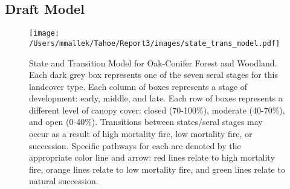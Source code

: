 \subsection*{Draft Model}
\begin{figure}[htbp]
\centering
\texttt{[image: /Users/mmallek/Tahoe/Report3/images/state\_trans\_model.pdf]}
\caption{State and Transition Model for Oak-Conifer Forest and Woodland. Each dark grey box represents one of the seven seral stages for this landcover type. Each column of boxes represents a stage of development: early, middle, and late. Each row of boxes represents a different level of canopy cover: closed (70-100\%), moderate (40-70\%), and open (0-40\%). Transitions between states/seral stages may occur as a result of high mortality fire, low mortality fire, or succession. Specific pathways for each are denoted by the appropriate color line and arrow: red lines relate to high mortality fire, orange lines relate to low mortality fire, and green lines relate to natural succession.} 
\label{transmodel}
\end{figure}

